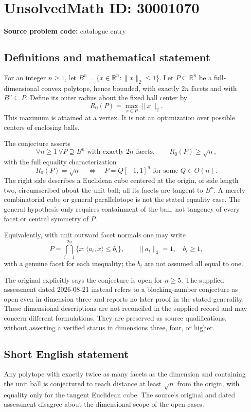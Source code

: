 \documentclass[11pt]{article}
\newcommand{\R}{\mathbb{R}}
\begin{document}
\section*{UnsolvedMath ID: 30001070}
\textbf{Source problem code:} catalogue entry
\subsection{Definitions and mathematical statement}
For an integer \(n\geq1\), let \(B^n=\{x\in\R^n:\|x\|_2\leq1\}\). Let \(P\subseteq\R^n\) be a full-dimensional convex polytope, hence bounded, with exactly \(2n\) facets and with \(B^n\subseteq P\). Define its outer radius about the fixed ball center by
\[
 R_0(P)=\max_{x\in P}\|x\|_2.
\]
This maximum is attained at a vertex. It is not an optimization over possible centers of enclosing balls.

The conjecture asserts
\[
 \forall n\geq1\ \forall P\supseteq B^n\text{ with exactly }2n\text{ facets},
 \qquad R_0(P)\geq\sqrt n,
\]
with the full equality characterization
\[
 R_0(P)=\sqrt n\quad\Longleftrightarrow\quad
 P=Q[-1,1]^n\text{ for some }Q\in O(n).
\]
The right side describes a Euclidean cube centered at the origin, of side length two, circumscribed about the unit ball; all its facets are tangent to \(B^n\). A merely combinatorial cube or general parallelotope is not the stated equality case. The general hypothesis only requires containment of the ball, not tangency of every facet or central symmetry of \(P\).

Equivalently, with unit outward facet normals one may write
\[
 P=\bigcap_{i=1}^{2n}\{x:\langle a_i,x\rangle\leq b_i\},
 \qquad\|a_i\|_2=1,\quad b_i\geq1,
\]
with a genuine facet for each inequality; the \(b_i\) are not assumed all equal to one.

The original explicitly says the conjecture is open for \(n\geq5\). The supplied assessment dated 2026-08-21 instead refers to a blocking-number conjecture as open even in dimension three and reports no later proof in the stated generality. These dimensional descriptions are not reconciled in the supplied record and may concern different formulations. They are preserved as source qualifications, without asserting a verified status in dimensions three, four, or higher.
\subsection{Short English statement}
Any polytope with exactly twice as many facets as the dimension and containing the unit ball is conjectured to reach distance at least \(\sqrt n\) from the origin, with equality only for the tangent Euclidean cube. The source's original and dated assessment disagree about the dimensional scope of the open cases.
\end{document}
